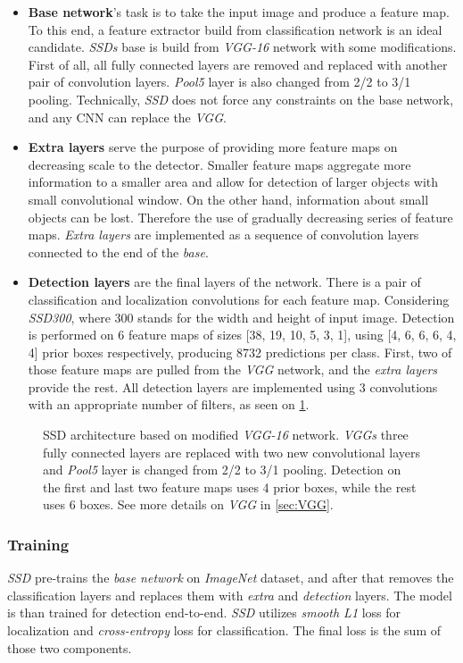 \begin{itemize}
    \item \textbf{Base network}'s task is to take the input image and produce a feature map. To this end, a feature extractor build from classification network is an ideal candidate. \textit{SSDs} base is build from \textit{VGG-16} network with some modifications. First of all, all fully connected layers are removed and replaced with another pair of convolution layers. \textit{Pool5} layer is also changed from 2/2 to 3/1 pooling. Technically, \textit{SSD} does not force any constraints on the base network, and any CNN can replace the \textit{VGG}.
    \item \textbf{Extra layers} serve the purpose of providing more feature maps on decreasing scale to the detector. Smaller feature maps aggregate more information to a smaller area and allow for detection of larger objects with small convolutional window. On the other hand, information about small objects can be lost. Therefore the use of gradually decreasing series of feature maps. \textit{Extra layers} are implemented as a sequence of convolution layers connected to the end of the \textit{base}.
    \item \textbf{Detection layers} are the final layers of the network. There is a pair of classification and localization convolutions for each feature map. Considering \textit{SSD300}, where 300 stands for the width and height of input image. Detection is performed on 6 feature maps of sizes [38, 19, 10, 5, 3, 1], using [4, 6, 6, 6, 4, 4] prior boxes respectively, producing 8732 predictions per class. First, two of those feature maps are pulled from the \textit{VGG} network, and the \textit{extra layers} provide the rest. All detection layers are implemented using 3 convolutions with an appropriate number of filters, as seen on \cref{fig:VGGSSD}.
\end{itemize}

\begin{figure}
    \VGGSSD
    \caption{SSD architecture based on modified \textit{VGG-16} network. \textit{VGGs} three fully connected layers are replaced with two new convolutional layers and \textit{Pool5} layer is changed from 2/2 to 3/1 pooling. Detection on the first and last two feature maps uses 4 prior boxes, while the rest uses 6 boxes. See more details on \textit{VGG} in \cref{sec:VGG}.}
    \label{fig:VGGSSD}
\end{figure}


\subsubsection{Training}
\textit{SSD} pre-trains the \textit{base network} on \textit{ImageNet} dataset, and after that removes the classification layers and replaces them with \textit{extra} and \textit{detection} layers. The model is than trained for detection end-to-end. \textit{SSD} utilizes \textit{smooth L1} loss for localization and \textit{cross-entropy} loss for classification. The final loss is the sum of those two components.

